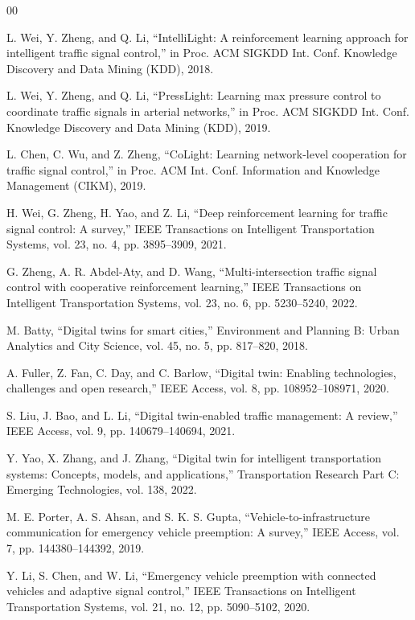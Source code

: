\documentclass[conference]{IEEEtran}
\begin{document}
\balance
\begin{thebibliography}{00}

 L. Wei, Y. Zheng, and Q. Li, “IntelliLight: A reinforcement learning approach for intelligent traffic signal control,” in Proc. ACM SIGKDD Int. Conf. Knowledge Discovery and Data Mining (KDD), 2018.

 L. Wei, Y. Zheng, and Q. Li, “PressLight: Learning max pressure control to coordinate traffic signals in arterial networks,” in Proc. ACM SIGKDD Int. Conf. Knowledge Discovery and Data Mining (KDD), 2019.

 L. Chen, C. Wu, and Z. Zheng, “CoLight: Learning network-level cooperation for traffic signal control,” in Proc. ACM Int. Conf. Information and Knowledge Management (CIKM), 2019.

 H. Wei, G. Zheng, H. Yao, and Z. Li, “Deep reinforcement learning for traffic signal control: A survey,” IEEE Transactions on Intelligent Transportation Systems, vol. 23, no. 4, pp. 3895–3909, 2021.

 G. Zheng, A. R. Abdel-Aty, and D. Wang, “Multi-intersection traffic signal control with cooperative reinforcement learning,” IEEE Transactions on Intelligent Transportation Systems, vol. 23, no. 6, pp. 5230–5240, 2022.

 M. Batty, “Digital twins for smart cities,” Environment and Planning B: Urban Analytics and City Science, vol. 45, no. 5, pp. 817–820, 2018.

 A. Fuller, Z. Fan, C. Day, and C. Barlow, “Digital twin: Enabling technologies, challenges and open research,” IEEE Access, vol. 8, pp. 108952–108971, 2020.

 S. Liu, J. Bao, and L. Li, “Digital twin-enabled traffic management: A review,” IEEE Access, vol. 9, pp. 140679–140694, 2021.

 Y. Yao, X. Zhang, and J. Zhang, “Digital twin for intelligent transportation systems: Concepts, models, and applications,” Transportation Research Part C: Emerging Technologies, vol. 138, 2022.

 M. E. Porter, A. S. Ahsan, and S. K. S. Gupta, “Vehicle-to-infrastructure communication for emergency vehicle preemption: A survey,” IEEE Access, vol. 7, pp. 144380–144392, 2019.

 Y. Li, S. Chen, and W. Li, “Emergency vehicle preemption with connected vehicles and adaptive signal control,” IEEE Transactions on Intelligent Transportation Systems, vol. 21, no. 12, pp. 5090–5102, 2020.


\end{thebibliography}
\end{document}
